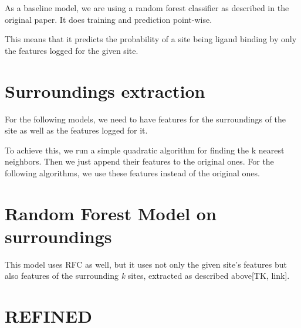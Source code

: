 As a baseline model, we are using a random forest classifier as described in the original paper. It does training and prediction point-wise.

This means that it predicts the probability of a site being ligand binding by only the features logged for the given site.

\section{Surroundings extraction}

For the following models, we need to have features for the surroundings of the site as well as the features logged for it.

To achieve this, we run a simple quadratic algorithm for finding the k nearest neighbors. Then we just append their features to the original ones. For the following algorithms, we use these features instead of the original ones.

\section{Random Forest Model on surroundings}

This model uses RFC as well, but it uses not only the given site's features but also features of the surrounding \textit{k} sites, extracted as described above[TK, link].

\section{REFINED}

